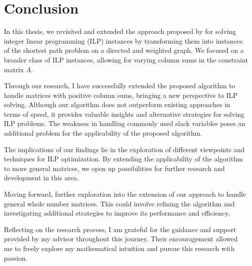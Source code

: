 \chapter{Conclusion}
In this thesis, we revisited and extended the approach proposed by \cite{algebraic_statistics} for solving integer linear programming (ILP) instances by transforming them into instances of the shortest path problem on a directed and weighted graph. We focused on a broader class of ILP instances, allowing for varying column sums in the constraint matrix $A$.

Through our research, I have successfully extended the proposed algorithm to handle matrices with positive column sums, bringing a new perspective to ILP solving. Although our algorithm does not outperform existing approaches in terms of speed, it provides valuable insights and alternative strategies for solving ILP problems. The weakness in handling commonly used slack variables poses an additional problem for the applicability of the proposed algorithm.

The implications of our findings lie in the exploration of different viewpoints and techniques for ILP optimization. By extending the applicability of the algorithm to more general matrices, we open up possibilities for further research and development in this area.

Moving forward, further exploration into the extension of our approach to handle general whole number matrices. This could involve refining the algorithm and investigating additional strategies to improve its performance and efficiency.

Reflecting on the research process, I am grateful for the guidance and support provided by my advisor throughout this journey. Their encouragement allowed me to freely explore my mathematical intuition and pursue this research with passion.

